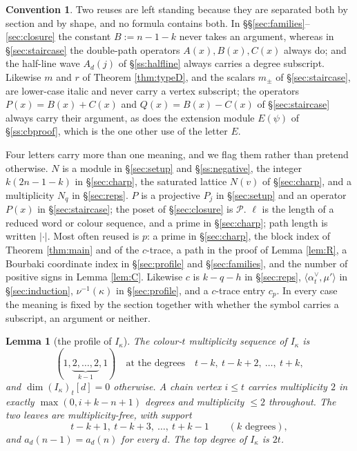 \documentclass[reqno]{amsart}
\theoremstyle{plain}
\newtheorem{lemma}[theorem]{Lemma}
\theoremstyle{definition}
\newtheorem{convention}[theorem]{Convention}
\newcommand{\al}{\alpha}
\newcommand{\ka}{\kappa}
\begin{document}
\begin{convention}
Two reuses are left standing because they are separated both by section and by
shape, and no formula contains both.  In \S\S\ref{sec:families}--\ref{sec:closure}
the constant $B:=n-1-k$ never takes an argument, whereas in
\S\ref{sec:staircase} the double-path operators $A(x),B(x),C(x)$ always do;
and the half-line wave $A_d(j)$ of \S\ref{ss:halfline} always carries a degree
subscript.  Likewise $m$ and $r$ of Theorem \ref{thm:typeD}, and the scalars
$m_{\pm}$ of \S\ref{sec:staircase}, are lower-case italic and never carry a
vertex subscript; the operators $P(x)=B(x)+C(x)$ and $Q(x)=B(x)-C(x)$ of
\S\ref{sec:staircase} always carry their argument, as does the extension
module $E(\psi)$ of \S\ref{ss:cbproof}, which is the one other use of the
letter $E$.

Four letters carry more than one meaning, and we flag them rather than pretend
otherwise.  $N$ is a module in \S\ref{sec:setup} and \S\ref{ss:negative}, the
integer $k(2n-1-k)$ in \S\ref{sec:charp}, the saturated lattice $N(v)$ of
\S\ref{sec:charp}, and a multiplicity $N_q$ in \S\ref{sec:reps}.  $P$ is a
projective $P_j$ in \S\ref{sec:setup} and an operator $P(x)$ in
\S\ref{sec:staircase}; the poset of \S\ref{sec:closure} is $\mathcal{P}$.
$\ell$ is the length of a reduced word or colour sequence, and a prime in
\S\ref{sec:charp}; path length is written $|\cdot|$.  Most often reused is
$p$: a prime in \S\ref{sec:charp}, the block index of Theorem \ref{thm:main}
and of the $c$-trace, a path in the proof of Lemma \ref{lem:R}, a Bourbaki
coordinate index in \S\ref{sec:profile} and \S\ref{sec:families}, and the
number of positive signs in Lemma \ref{lem:C}.  Likewise $c$ is $k-q-h$ in
\S\ref{sec:reps}, $\langle\al_t^\vee,\mu'\rangle$ in \S\ref{sec:induction},
$\nu^{-1}(\ka)$ in \S\ref{sec:profile}, and a $c$-trace entry $c_p$.  In every
case the meaning is fixed by the section together with whether the symbol
carries a subscript, an argument or neither.
\end{convention}

\begin{lemma}[the profile of $I_\ka$]\label{lem:P}
The colour-$t$ multiplicity sequence of $I_\ka$ is
\[
   (1,\underbrace{2,\dots,2}_{k-1},1)
   \quad\text{at the degrees}\quad t-k,\ t-k+2,\ \dots,\ t+k,
\]
and $\dim(I_\ka)_t[d]=0$ otherwise.  A chain vertex $i\le t$ carries
multiplicity $2$ in exactly $\max(0,i+k-n+1)$ degrees and multiplicity $\le 2$
throughout.  The two leaves are multiplicity-free, with support
\[
   t-k+1,\ t-k+3,\ \dots,\ t+k-1 \qquad (k \text{ degrees}),
\]
and $a_d(n-1)=a_d(n)$ for every $d$.  The top degree of $I_\ka$ is $2t$.
\end{lemma}
\end{document}
